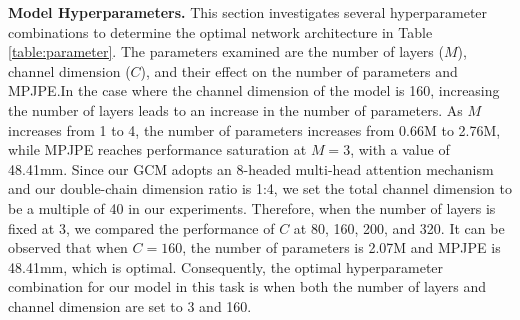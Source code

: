 \documentclass[journal]{IEEEtran}
\begin{document}
\begin{table}[ht]
\caption{Ablation study on the hyperparameters of our model. $M$ denotes the number of layers, $C$ denotes the channel dimension.}
\label{table:parameter}
\centering {}
\end{table}


{\bf{Model Hyperparameters.}} This section investigates several hyperparameter combinations to determine the optimal network architecture in Table \ref{table:parameter}. The parameters examined are the number of layers ($M$), channel dimension ($C$), and their effect on the number of parameters and MPJPE.In the case where the channel dimension of the model is 160, increasing the number of layers leads to an increase in the number of parameters. As $M$ increases from 1 to 4, the number of parameters increases from 0.66M to 2.76M, while MPJPE reaches performance saturation at $M=3$, with a value of 48.41mm. Since our GCM adopts an 8-headed multi-head attention mechanism and our double-chain dimension ratio is 1:4, we set the total channel dimension to be a multiple of 40 in our experiments. Therefore, when the number of layers is fixed at 3, we compared the performance of $C$ at 80, 160, 200, and 320. It can be observed that when $C=160$, the number of parameters is 2.07M and MPJPE is 48.41mm, which is optimal. Consequently, the optimal hyperparameter combination for our model in this task is when both the number of layers and channel dimension are set to 3 and 160.
\end{document}
